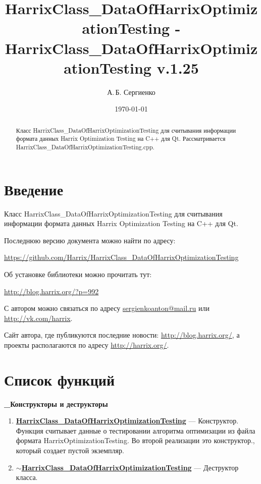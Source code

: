 \documentclass[a4paper,12pt]{article}
\title{Har\-rix\-Class\_Da\-ta\-Of\-Har\-rix\-Op\-ti\-mi\-za\-ti\-on\-Test\-ing - Har\-rix\-Class\_Da\-ta\-Of\-Har\-rix\-Op\-ti\-mi\-za\-ti\-on\-Test\-ing v.1.25}
\author{А.\,Б. Сергиенко}
\date{\today}
\begin{document}


\maketitle

\begin{abstract}
Класс HarrixClass\_DataOfHarrixOptimizationTesting для считывания информации формата данных Harrix Optimization Testing на C++ для Qt. Рассматривается HarrixClass\_DataOfHarrixOptimizationTesting.cpp.
\end{abstract}

\tableofcontents

\newpage

\section{Введение}

Класс HarrixClass\_DataOfHarrixOptimizationTesting для считывания информации формата данных Harrix Optimization Testing на C++ для Qt.

Последнюю версию документа можно найти по адресу:

\href{https://github.com/Harrix/HarrixClass\_DataOfHarrixOptimizationTesting}{https://github.com/Harrix/HarrixClass\_DataOfHarrixOptimizationTesting}

Об установке библиотеки можно прочитать тут:

\href{http://blog.harrix.org/?p=992}{http://blog.harrix.org/?p=992}

С автором можно связаться по адресу \href{mailto:sergienkoanton@mail.ru}{sergienkoanton@mail.ru} или  \href{http://vk.com/harrix}{http://vk.com/harrix}.

Сайт автора, где публикуются последние новости: \href{http://blog.harrix.org/}{http://blog.harrix.org/}, а проекты располагаются по адресу \href{http://harrix.org/}{http://harrix.org/}.

\newpage
\section{Список функций}\label{section_listfunctions}
\textbf{\_Конструкторы и деструкторы}
\begin{enumerate}

\item \textbf{\hyperref[HarrixClass_DataOfHarrixOptimizationTesting]{HarrixClass\_DataOfHarrixOptimizationTesting}} --- Конструктор. Функция считывает данные о тестировании алгоритма оптимизации из файла формата HarrixOptimizationTesting. Во второй реализации это конструктор., который создает пустой экземпляр.

\item \textbf{\hyperref[tildaHarrixClass_DataOfHarrixOptimizationTesting]{$\sim$HarrixClass\_DataOfHarrixOptimizationTesting}} --- Деструктор класса.

\end{enumerate}
\end{document}
